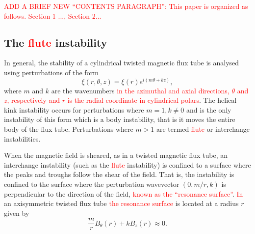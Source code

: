 \documentclass[12pt]{article}
\newcommand{\rs}[2]{\textcolor{red}{#2}}
\begin{document}
\rs{}{ADD A BRIEF NEW ``CONTENTS PARAGRAPH'':
This paper is organized as follows. Section 1 ..., Section 2...}

\subsection{The \rs{fluting}{flute} instability}

In general, the stability of a cylindrical twisted magnetic flux tube is analysed using perturbations of the form
\begin{equation}
  \label{eq:kink_perturbation}
\xi(r, \theta, z) = \xi(r) e^{i(m\theta + kz)},
\end{equation}
where $m$ and $k$ are the wavenumbers \rs{in the $\theta$ and $z$
  directions, respectively}{in the azimuthal and axial directions,
  $\theta$ and $z$, respectively and $r$ is the radial coordinate in
  cylindrical polars}. 
The helical kink instability occurs for perturbations where $m=1, k\ne0$ and is the only instability of this form which is a body instability, that is it moves the entire body of the flux tube. Perturbations where $m>1$ are termed \rs{fluting}{flute} or interchange instabilities.

When the magnetic field is sheared, as in a twisted magnetic flux
tube, an interchange instability (such as the \rs{fluting}{flute}
instability) is confined to a surface where the peaks and troughs
follow the shear of the field. That is, the instability is confined to
the surface where the perturbation wavevector $(0, m/r, k)$ is
perpendicular to the direction of the field, \rs{}{known as the
  ``resonance surface''}. \rs{which in}{In} an axisymmetric twisted
flux tube \rs{}{the resonance surface} is located at a radius $r$
given by
\begin{equation}
  \label{eq:resonant_surface}
\frac{m}{r} B_{\theta}(r) + kB_z(r) \approx 0.
\end{equation}
\end{document}
